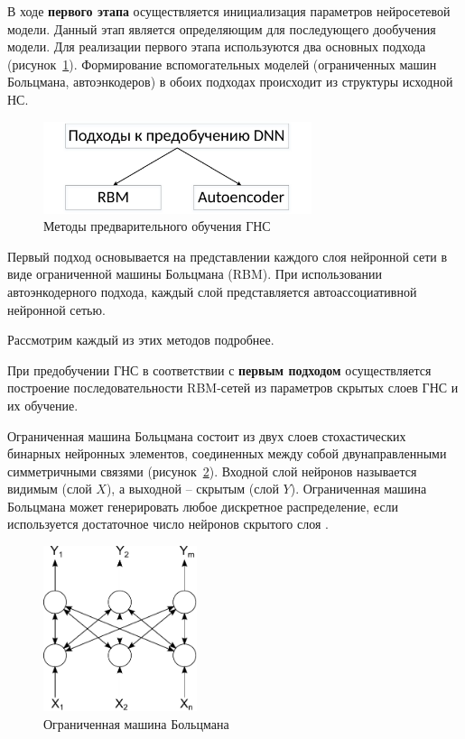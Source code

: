 В ходе \textbf{первого этапа} осуществляется инициализация параметров нейросетевой модели. Данный этап является определяющим для последующего дообучения модели.
Для реализации первого этапа используются два основных подхода (рисунок~\ref{fig:pic1_2}).
Формирование вспомогательных моделей (ограниченных машин Больцмана, автоэнкодеров) в обоих подходах происходит из структуры исходной НС. 

\begin{figure}[H]
  \centering
  \includegraphics[width=0.7\textwidth]{man-source/images/ch1/pic1-2.pdf}
  \caption{Методы предварительного обучения ГНС}
  \label{fig:pic1_2}
\end{figure}

Первый подход основывается на представлении каждого слоя нейронной сети в виде ограниченной машины Больцмана (RBM). При использовании автоэнкодерного подхода, каждый слой представляется автоассоциативной нейронной сетью.

Рассмотрим каждый из этих методов подробнее.

\def\slantfrac#1#2{ \hspace{3pt}\!^{#1}\!\!\hspace{1pt}/
  \hspace{2pt}\!\!_{#2}\!\hspace{3pt}
}

При предобучении ГНС в соответствии с \textbf{первым подходом} осуществляется построение последовательности RBM-сетей из параметров скрытых слоев ГНС и их обучение. 

Ограниченная машина Больцмана состоит из двух слоев стохастических бинарных нейронных элементов, соединенных между собой двунаправленными симметричными связями (рисунок~\ref{fig:pic1_3}). Входной слой нейронов называется видимым (слой $X$), а выходной -- скрытым (слой $Y$). Ограниченная машина Больцмана может генерировать любое дискретное распределение, если используется достаточное число нейронов скрытого слоя \cite[c.~57]{n5}.

\begin{figure}[H]
  \centering
  \includegraphics[width=0.4\textwidth]{man-source/images/ch1/pic1-3.pdf}
  \caption{Ограниченная машина Больцмана}
  \label{fig:pic1_3}
\end{figure}	

